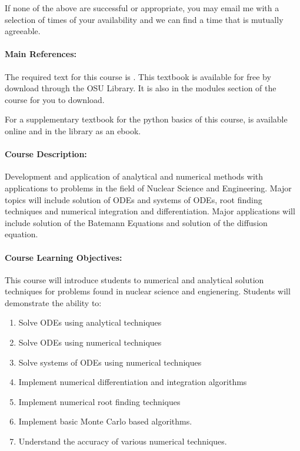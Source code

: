 \documentclass[11pt, a4paper]{article}
\begin{document}
If none of the above are successful or appropriate, you may email me with a
selection of times of your availability and we can find a time that is mutually
agreeable.

\paragraph{Main References:}
The required text for this course is \cite{mcclarren_computational_2017}. This textbook is available for free by download through the OSU Library. It is also in the modules section of the course for you to download. 

For a supplementary textbook for the python basics of this course, \cite{scopatz_effective_2015} is available online and in the library as an ebook.



\renewcommand{\refname}{\normalfont\selectfont\normalsize}\vspace{-1cm}


\paragraph{Course Description:}
Development and application of analytical and numerical methods with 
applications to problems in the field of Nuclear Science and Engineering. 
Major topics will include solution of ODEs and systems of ODEs, root finding techniques and numerical integration and differentiation. Major applications will
include solution of the Batemann Equations and solution of the diffusion equation. 

\paragraph{Course Learning Objectives:}

This course will introduce students to numerical and analytical solution
techniques for problems found in nuclear science and engienering. Students
will demonstrate the ability to: 

\begin{enumerate}
\item Solve ODEs using analytical techniques
\item Solve ODEs using numerical techniques
\item Solve systems of ODEs using numerical techniques
\item Implement numerical differentiation and integration algorithms
\item Implement numerical root finding techniques
\item Implement basic Monte Carlo based algorithms. 
\item Understand the accuracy of various numerical techniques. 
\end{enumerate}
\end{document}
